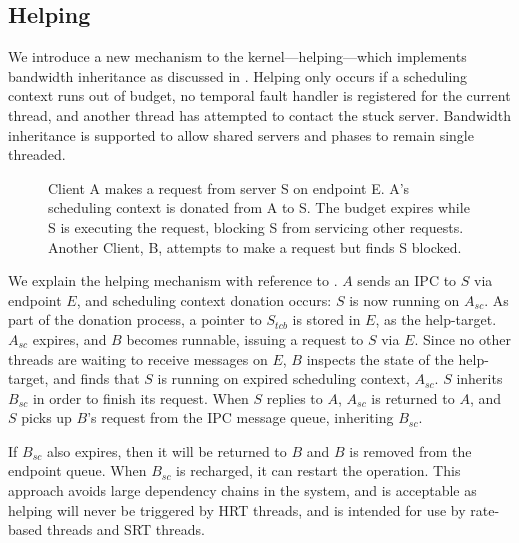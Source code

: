 \subsection{Helping}

We introduce a new mechanism to the kernel---helping---which implements bandwidth inheritance as discussed in .
Helping only occurs if a scheduling context runs out of budget, no temporal fault handler is registered for the current thread, and another thread has attempted to contact the stuck server.
Bandwidth inheritance is supported to allow shared servers and phases to remain single threaded.

\begin{figure}
\centering
\caption{Client A makes a request from server S on endpoint E. A's scheduling context is donated from A to S. The budget expires while S is executing the request, blocking S from servicing other requests. Another Client, B, attempts to make a request but finds S blocked.}
\label{fig:budget-expiry}
\end{figure}

We explain the helping mechanism with reference to .
$A$ sends an IPC to $S$ via endpoint $E$, and scheduling context donation occurs: $S$ is now running on $A_{sc}$.
As part of the donation process, a pointer to $S_{tcb}$ is stored in $E$, as the help-target.
$A_{sc}$ expires, and $B$ becomes runnable, issuing a request to $S$ via $E$.
Since no other threads are waiting to receive messages on $E$, $B$ inspects the state of the help-target, and finds that $S$ is running on expired scheduling context, $A_{sc}$.
$S$ inherits $B_{sc}$ in order to finish its request.
When $S$ replies to $A$, $A_{sc}$ is returned to $A$, and $S$ picks up $B$'s request from the IPC message queue, inheriting $B_{sc}$.

If $B_{sc}$ also expires, then it will be returned to $B$ and $B$ is removed from the endpoint queue.
When $B_{sc}$ is recharged, it can restart the operation.
This approach avoids large dependency chains in the system, and is acceptable as helping will never be triggered by \gls{HRT} threads, and is intended for use by rate-based threads and \gls{SRT} threads.

